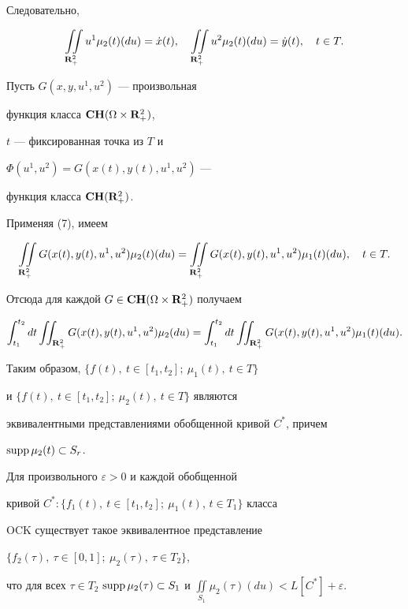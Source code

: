 \begin{pf}
Следовательно,


$$


\iint\limits_{{\bold R}^2_+}


u^1\mu_2(t)(du)=\Dot{x}(t),\quad \iint\limits_{{\bold R}^2_+}


u^2\mu_2(t)(du)=\Dot{y}(t),\quad t\in T.


$$


Пусть $G(x,y,u^1,u^2)$ --- произвольная


функция класса $\bold{CH}(\Omega \times {\bold R}^2_+)$,


$t$ --- фиксированная точка из $T$ и


$\Phi(u^1,u^2)=G(x(t),y(t),u^1,u^2)$ ---


функция класса $\bold{CH}({\bold R}^2_+)$.


Применяя (7), имеем


$$


\iint\limits_{{\bold R}^2_+}


G(x(t),y(t),u^1,u^2)\mu_2(t)(du)= \iint\limits_{{\bold R}^2_+}


G(x(t),y(t),u^1,u^2)\mu_1(t)(du), \quad t\in T.


$$


Отсюда для каждой $G\in \bold{CH}(\Omega \times {\bold R}^2_+)$ получаем


$$


\int_{t_1}^{t_2} dt


\iint_{{\bold R}^2_+} G(x(t),y(t),u^1,u^2)\mu_2(du)=


\int_{t_1}^{t_2} dt


\iint_{{\bold R}^2_+} G(x(t),y(t),u^1,u^2)\mu_1(t)(du).


$$


Таким образом, $\{f(t),\ t\in [t_1,t_2];\ \mu_1(t),\ t\in T\}$


и $\{f(t),\  t\in [t_1,t_2];\ \mu_2(t),\ t\in T\}$ являются


эквивалентными представлениями обобщенной кривой $C^*$, причем


$\operatorname{supp}\mu_2(t)\subset S_r$.


\end{pf}





\begin{lem}


Для произвольного $\varepsilon>0$ и каждой обобщенной


кривой $C^*:\{f_1(t),\ t\in [t_1,t_2];\ \mu_1(t)$, $t\in T_1\}$ класса


$\mathrm{OCK}$ существует такое эквивалентное представление


$\{f_2(\tau),\ \tau\in [0,1];\ \mu_2(\tau),\ \tau\in T_2\}$,


что для всех $\tau\in T_2$\; $\supp\mu_2(\tau) \subset


S_1$ и $\iint\limits_{S_1}\mu_2(\tau)(du)<L[C^*]+\varepsilon$.


\end{lem}





